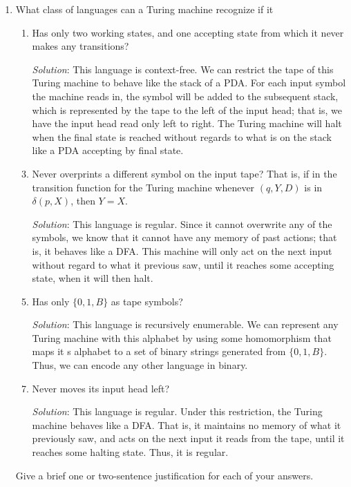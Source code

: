 \documentclass[]{article}
\begin{document}
\begin{enumerate}
\item What class of languages can a Turing machine recognize if it
\begin{enumerate}
\item Has only two working states, and one accepting state from which it never
makes any transitions?
\item[\emph{Solution}:] This language is context-free. We can restrict the tape
of this Turing machine to behave like the stack of a PDA. For each input symbol
the machine reads in, the symbol will be added to the subsequent stack, which is
represented by the tape to the left of the input head; that is, we have the
input head read only left to right. The Turing machine will halt when the final
state is reached without regards to what is on the stack like a PDA accepting by
final state.

\item Never overprints a different symbol on the input tape? That is, if in the
transition function for the Turing machine whenever $(q, Y, D)$ is in
$\delta(p,X)$, then $Y = X$.
\item[\emph{Solution}:] This language is regular. Since it cannot overwrite any
of the symbols, we know that it cannot have any memory of past actions; that is,
it behaves like a DFA. This machine will only act on the next input without
regard to what it previous saw, until it reaches some accepting state, when it
will then halt.

\item Has only $\{0, 1, B\}$ as tape symbols?
\item[\emph{Solution}:] This language is recursively enumerable. We can
represent any Turing machine with this alphabet by using some homomorphism that
maps it  s alphabet to a set of binary strings generated from $\{0, 1, B\}$.
Thus, we can encode any other language in binary.

\item Never moves its input head left?
\item[\emph{Solution}:] This language is regular. Under this restriction, the
Turing machine behaves like a DFA. That is, it maintains no memory of what it
previously saw, and acts on the next input it reads from the tape, until it
reaches some halting state. Thus, it is regular.
\end{enumerate}

Give a brief one or two-sentence justification for each of your answers.
\end{enumerate}
\end{document}
